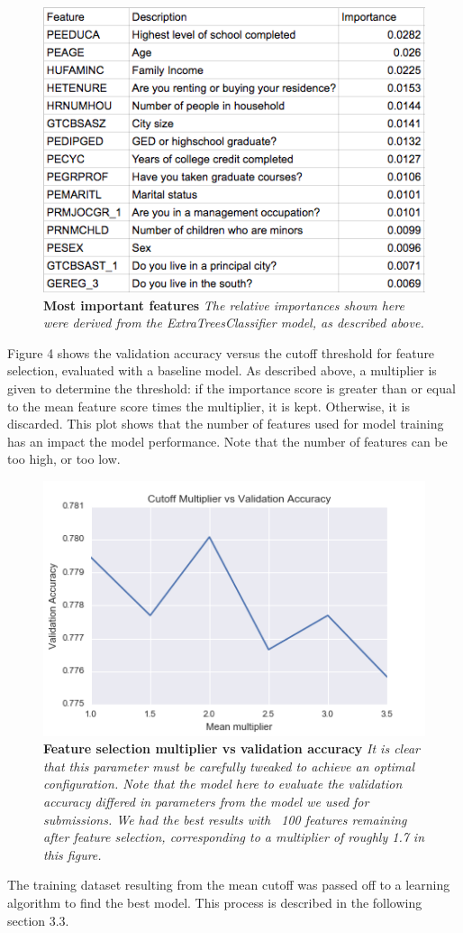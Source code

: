 \newpage

\begin{figure}[h]
\center
\includegraphics[scale=0.48]{figure5/top_features.png}
\caption{\textbf{Most important features}
\textit{The relative importances shown here were derived from the ExtraTreesClassifier model, as described above.}}
\end{figure}

Figure 4 shows the validation accuracy versus the cutoff threshold for feature selection, evaluated with a baseline model. As described above, a multiplier is given to determine the threshold: if the importance score is greater than or equal to the mean feature score times the multiplier, it is kept. Otherwise, it is discarded. This plot shows that the number of features used for model training has an impact the model performance. Note that the number of features can be too high, or too low.
\begin{figure}[h]
\center
\includegraphics[scale=0.54]{figure5/multiplier_vs_val_acc.png}
\caption{\textbf{Feature selection multiplier vs validation accuracy}
\textit{It is clear that this parameter must be carefully tweaked to achieve an optimal configuration. Note that the model here to evaluate the validation accuracy differed in parameters from the model we used for submissions. We had the best results with ~100 features remaining after feature selection, corresponding to a multiplier of roughly 1.7 in this figure.}}
\end{figure}
The training dataset resulting from the mean cutoff was passed off to a learning algorithm to find the best model. This process is described in the following section 3.3. 

